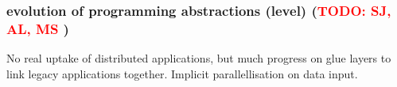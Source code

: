 \documentclass{article}
\newcommand{\B}[1]{\textbf{#1}}
\newcommand{\todo}[1]{{\textcolor{red}{\B{TODO:} #1 }}}
\begin{document}
 \subsubsection{ evolution of programming abstractions (level) (\todo{SJ, AL, MS})}
 
 No real uptake of distributed applications, but much progress on glue
 layers to link legacy applications together.  Implicit
 parallellisation on data input.


\newpage

\footnotesize


\end{document}
